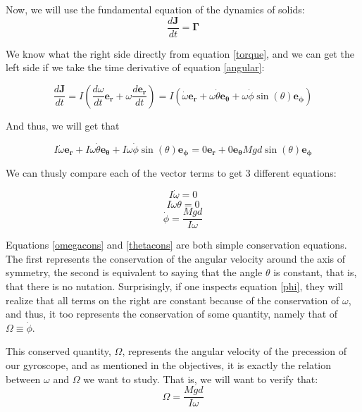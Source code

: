 \documentclass[a4paper,12pt]{article}
\begin{document}
Now, we will use the fundamental equation of the dynamics of solids:
\begin{equation}
	\label{fund}
	\frac{d \boldsymbol{J}}{dt} = \boldsymbol{\Gamma}	
\end{equation}

We know what the right side directly from equation \eqref{torque}, and we can get the left side if we take the time derivative of equation \eqref{angular}:

$$\frac{d \boldsymbol{J}}{dt} = I \left(\frac{d\omega}{dt} \boldsymbol{e_r} + \omega \frac{d\boldsymbol{e_r}}{dt}\right) = I \left(\dot{\omega} \boldsymbol{e_r} + \omega\dot{\theta} \boldsymbol{e_\theta} + \omega \dot{\phi} \sin(\theta) \boldsymbol{e_\phi}  \right)$$ 

And thus, we will get that 

\begin{equation}
	 I \dot{\omega} \boldsymbol{e_r} + I\omega\dot{\theta} \boldsymbol{e_\theta} + I\omega \dot{\phi} \sin(\theta) \boldsymbol{e_\phi} = 0 \boldsymbol{e_r} + 0 \boldsymbol{e_\theta} M g d \sin(\theta) \boldsymbol{e_{\phi}}
\end{equation}

We can thusly compare each of the vector terms to get 3 different equations:

\begin{equation}
	\label{omegacons}
	I \dot{\omega} = 0
\end{equation}
\begin{equation}
	\label{thetacons}
	I \omega \dot{\theta} = 0
\end{equation}
\begin{equation}
	\label{phi}
	\dot{\phi} = \frac{M g d}{I\omega}
\end{equation}


Equations \eqref{omegacons} and \eqref{thetacons} are both simple conservation equations. The first represents the conservation of the angular velocity around the axis of symmetry, the second is equivalent to saying that the angle $\theta$ is constant, that is, that there is no nutation. Surprisingly, if one inspects equation \eqref{phi}, they will realize that all terms on the right are constant because of the conservation of $\omega$, and thus, it too represents the conservation of some quantity, namely that of $\Omega \equiv \dot{\phi}$. 

This conserved quantity, $\Omega$, represents the angular velocity of the precession of our gyroscope, and as mentioned in the objectives, it is exactly the relation between $\omega$ and $\Omega$ we want to study. That is, we will want to verify that:
\begin{equation}
  \label{Omegaomega}
 	\Omega = \frac{M g d}{I \omega}
 \end{equation} 
\end{document}
